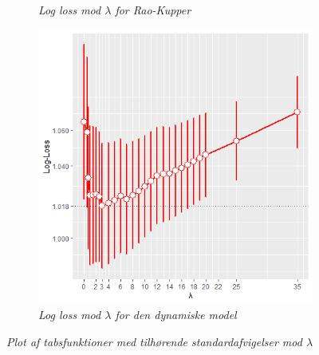 \documentclass[11pt,a4paper]{article}
\begin{document}
\begin{figure}[h!]
\begin{subfigure}[b]{0.45\linewidth}
    \caption{\textit{Log loss mod $\lambda$ for Rao-Kupper}}
    \label{fig:LogLossBarStat}
  \end{subfigure}
  \hspace{0.2cm}
      \begin{subfigure}[b]{0.45\linewidth}
\includegraphics[width=\textwidth]{BARPLOTLOGALPHANY.png}
    \caption{\textit{Log loss mod $\lambda$ for den dynamiske model}}
    \label{fig:LogLossBarDyn}  
    \end{subfigure}
\caption{\textit{Plot af tabsfunktioner med tilhørende standardafvigelser mod $\lambda$ }}
  \label{fig:Tabsfunktioner}
\end{figure}
\end{document}

